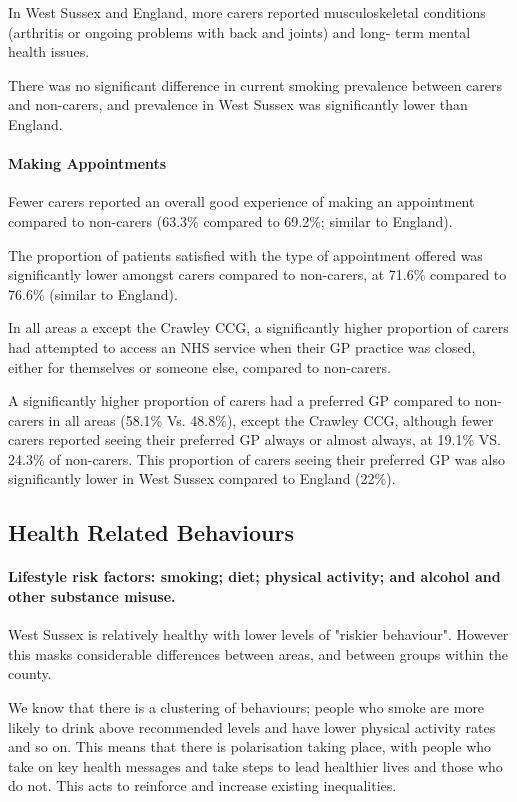 In West Sussex and England, more carers reported musculoskeletal conditions (arthritis or ongoing problems with back and joints) and long- term mental health issues.

There was no significant difference in current smoking prevalence between carers and non-carers, and prevalence in West Sussex was significantly lower than England.

\paragraph{Making Appointments} Fewer carers reported an overall good experience of making an appointment compared to non-carers (63.3\% compared to 69.2\%; similar to England).

The proportion of patients satisfied with the type of appointment offered was significantly lower amongst carers compared to non-carers, at 71.6\% compared to 76.6\% (similar to England).

In all areas a except the Crawley CCG, a significantly higher proportion of carers had attempted to access an NHS service when their GP practice was closed, either for themselves or someone else, compared to non-carers.

A significantly higher proportion of carers had a preferred GP compared to non-carers in all areas (58.1\% Vs. 48.8\%), except the Crawley CCG, although fewer carers reported seeing their preferred GP always or almost always, at 19.1\% VS. 24.3\% of non-carers. This proportion of carers seeing their preferred GP was also significantly lower in West Sussex compared to England (22\%).

\subsection{Health Related Behaviours}
\paragraph{Lifestyle risk factors: smoking; diet; physical activity; and alcohol and other substance misuse.}

West Sussex is relatively healthy with lower levels of "riskier behaviour". However this masks considerable differences between areas, and between groups within the county.

We know that there is a clustering of behaviours; people who smoke are more likely to drink above recommended levels and have lower physical activity rates and so on. This means that there is polarisation taking place, with people who take on key health messages and take steps to lead healthier lives and those who do not. This acts to reinforce and increase existing inequalities.

